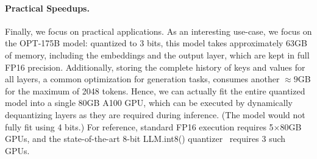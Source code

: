 \begin{table}[h]
    \centering
    \vspace{5pt}
    \caption{Results summary for OPT-175B and BLOOM-176B; 3G indicates 3-bit results with group-size 1024.}
    \label{tab:results-biggest-models}
\end{table}
\vspace{-10pt}

\paragraph{Practical Speedups.} 
Finally, we focus on practical applications. 
As an interesting use-case, we focus on the OPT-175B model: quantized to 3 bits, this model takes approximately 63GB of memory, including the embeddings and the output layer, which are kept in full FP16 precision. 
Additionally, storing the complete history of keys and values for all layers, a common optimization for generation tasks, consumes another $\approx 9$GB for the maximum of 2048 tokens. Hence, we can actually fit the entire quantized model into a single 80GB A100 GPU, which can be executed by dynamically dequantizing layers as they are required during inference. (The model would not fully fit using 4 bits.) 
For reference, standard FP16 execution requires 5$\times$80GB GPUs, and the state-of-the-art 8-bit LLM.int8() quantizer~\cite{dettmers2022llm} requires 3 such GPUs. 

